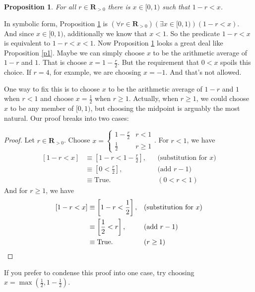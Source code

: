 \documentclass[12pt,fleqn]{article}
\newcommand{\reals}{\mathbf{R}}
\newcommand{\true}{\mathrm{True}}
\newenvironment{myproof}
  {\begin{shaded}\begin{proof}}
  {\end{proof}\end{shaded}}
\newtheorem{prop}{Proposition}
\begin{document}
\begin{prop} 
     For all $r \in \reals_{>0}$ there is $x \in [0,1)$ such that $1-r < x$.  \label{p2}
\end{prop}

\noindent In symbolic form, Proposition \ref{p2} is $\left(\forall r  \in \reals_{>0} \right) \left(\exists x \in [0,1)\right) \left (1-r  < x \right)$.
And since $x \in [0,1)$, additionally we know that $x < 1$.  So the predicate $1-r  < x$ is equivalent to $1-r  < x  < 1$. Now Proposition \ref{p2}
looks a great deal like  Proposition \ref{p1}. Maybe we can simply choose $x$ to be the arithmetic average of $1-r$ and $1$. That is
choose $x = 1 - \frac{r}{2}$.  But the requirement that $0 < x$ spoils this choice. If $r = 4$, for example, we are choosing $x = -1$. And that's 
not allowed.    

One way to fix this is to choose $x$ to be the arithmetic average of $1-r$ and $1$ when $r < 1$ and choose $x = \frac{1}{2}$ when $r \geq 1$. 
Actually, when $r \geq 1$, we could choose $x$ to be any member of $[0,1)$, but choosing the midpoint is arguably the most natural.
Our proof breaks into two cases:
     
      \begin{myproof} Let $r \in \reals_{>0}$. Choose $x = \begin{cases} 1 - \frac{r}{2}  & r < 1 \\ \frac{1}{2} & r \geq 1 \end{cases}$. For $r < 1$, we have
      \begin{align*}
       \left[1-r < x \right] &\equiv \left[1-r < 1 - \frac{r}{2}  \right], && \text{(substitution for $x$)} \\
                                  &\equiv  \left[0 <  \frac{r}{2}  \right], && \text{(add $r-1$)} \\
                                  &\equiv \true.   &&(0 < r < 1)
      \end{align*}
      And for $r \geq 1$, we have
       \begin{align*}
       \left[1-r < x \right] &\equiv \left[1-r < \frac{1}{2}  \right], && \text{(substitution for $x$)} \\
                                  &\equiv  \left[\frac{1}{2}  <  r  \right], && \text{(add $r-1$)} \\
                                  &\equiv \true.   &&(r \geq 1) \qedhere
      \end{align*}
      \end{myproof}
 \noindent If you prefer to condense this proof into one case, try choosing $x = \max(\frac{1}{2}, 1-\frac{1}{2})$.
\end{document}
